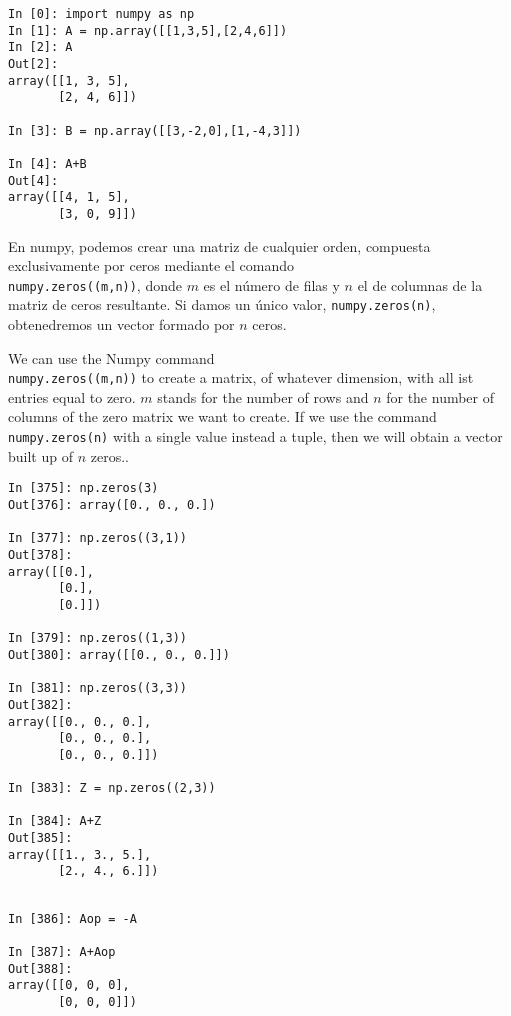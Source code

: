 \begin{center}
    \begin{minipage}{.5\textwidth}
    \begin{verbatim}
In [0]: import numpy as np
In [1]: A = np.array([[1,3,5],[2,4,6]])
In [2]: A
Out[2]: 
array([[1, 3, 5],
       [2, 4, 6]])

In [3]: B = np.array([[3,-2,0],[1,-4,3]])

In [4]: A+B
Out[4]: 
array([[4, 1, 5],
       [3, 0, 9]])

    \end{verbatim}
        
    \end{minipage}
\end{center}
\begin{paracol}{2}
En numpy, podemos crear una matriz de cualquier orden, compuesta exclusivamente por ceros mediante el comando\\ \texttt{numpy.zeros((m,n))}, donde $m$ es el número de filas y $n$ el de columnas de la matriz de ceros resultante. Si damos un único valor, \texttt{numpy.zeros(n)}, obtenedremos un vector formado por $n$ ceros.

\switchcolumn
We can use the Numpy command\\ \texttt{numpy.zeros((m,n))} to create a matrix, of whatever dimension, with all ist entries equal to zero. $m$ stands for the number of rows and $n$ for the number of columns of the zero matrix we want to create. If we use the command \texttt{numpy.zeros(n)} with a single value instead a tuple, then we will obtain a vector built up of $n$ zeros..  
\end{paracol}
\begin{center}
    \begin{minipage}{.3\textwidth}
        \begin{verbatim}
In [375]: np.zeros(3)
Out[376]: array([0., 0., 0.])

In [377]: np.zeros((3,1))
Out[378]: 
array([[0.],
       [0.],
       [0.]])

In [379]: np.zeros((1,3))
Out[380]: array([[0., 0., 0.]])

In [381]: np.zeros((3,3))
Out[382]: 
array([[0., 0., 0.],
       [0., 0., 0.],
       [0., 0., 0.]])
       
In [383]: Z = np.zeros((2,3))

In [384]: A+Z
Out[385]: 
array([[1., 3., 5.],
       [2., 4., 6.]])
\end{verbatim}
    \end{minipage}
\end{center}
\begin{center}
    \begin{minipage}{.3\textwidth}
        \begin{verbatim}       

In [386]: Aop = -A

In [387]: A+Aop
Out[388]: 
array([[0, 0, 0],
       [0, 0, 0]])
        \end{verbatim}
    \end{minipage}
\end{center}

